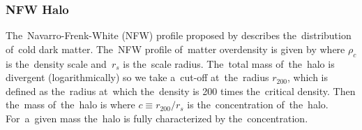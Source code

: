 
\subsubsection{NFW Halo}
The~Navarro-Frenk-White (NFW) profile proposed by \textcite{1996ApJ...462..563N} describes the~distribution of~cold dark matter. The~NFW profile of~matter overdensity is given by
where $\rho_c$ is the~density scale and~$r_s$ is the~scale radius. The~total mass of~the~halo is divergent (logarithmically) so we take a~cut-off at~the~radius $r_{200}$, which is defined as the~radius at~which the~density is 200 times the~critical density. Then the~mass of~the~halo is
where $c\equiv r_{200}/r_s$ is the~concentration of~the~halo. For~a~given mass the~halo is fully characterized by the~concentration.

